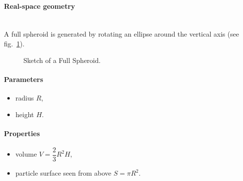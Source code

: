 \paragraph{Real-space geometry}\strut\\
A full spheroid is generated by rotating an ellipse around the vertical
axis (see fig.~\ref{fig:fullspheroid}).

\begin{figure}[ht]
\hfill
{}
\hfill
{}
\hfill
\caption{Sketch of a Full Spheroid. }
\label{fig:fullspheroid}
\end{figure}

\FloatBarrier

\paragraph{Parameters}
\begin{itemize}
\item radius $R$,
\item height $H$.
\end{itemize}

\paragraph{Properties}
\begin{itemize}
\item volume $V =\dfrac{2}{3}R^2H$,
\item particle surface seen from above $S =\pi R^2$. 
\end{itemize}


